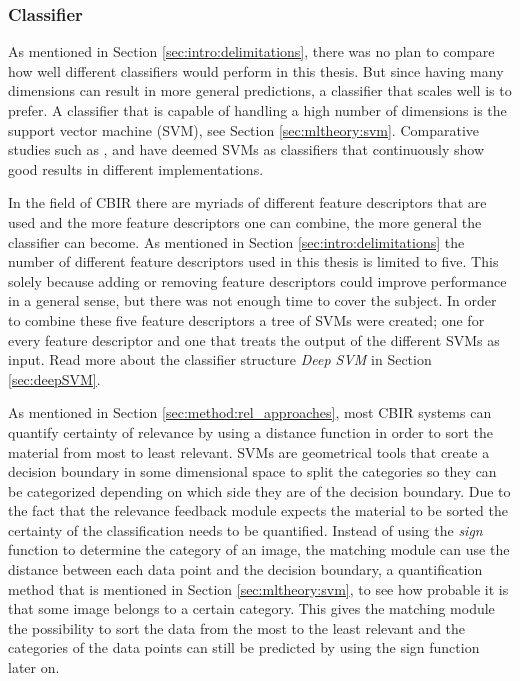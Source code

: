 \subsubsection{Classifier}
\label{sec:method:proposed:matching:classifier}
As mentioned in Section \ref{sec:intro:delimitations}, there was no plan to compare how well different classifiers would perform in this thesis. 
But since having many dimensions can result in more general predictions, a classifier that scales well is to prefer. A classifier that is capable of handling a high number of dimensions is the support vector machine (SVM), see Section \ref{sec:mltheory:svm}. 
Comparative studies such as \cite{IRJET2017classificationMethods}, \cite{SMMR2016comparisionClassificationMethods} and \cite{Informatica2007revClassification} have deemed SVMs as classifiers that continuously show good results in different implementations. 

In the field of CBIR there are myriads of different feature descriptors that are used and the more feature descriptors one can combine, the more general the classifier can become. As mentioned in Section \ref{sec:intro:delimitations} the number of different feature descriptors used in this thesis is limited to five. This solely because adding or removing feature descriptors could improve performance in a general sense, but there was not enough time to cover the subject. In order to combine these five feature descriptors a tree of SVMs were created; one for every feature descriptor and one that treats the output of the different SVMs as input. Read more about the classifier structure \emph{Deep SVM} in Section \ref{sec:deepSVM}. 

As mentioned in Section \ref{sec:method:rel_approaches}, most CBIR systems can quantify certainty of relevance by using a distance function in order to sort the material from most to least relevant. SVMs are geometrical tools that create a decision boundary in some dimensional space to split the categories so they can be categorized depending on which side they are of the decision boundary. Due to the fact that the relevance feedback module expects the material to be sorted the certainty of the classification needs to be quantified. Instead of using the \emph{sign} function to determine the category of an image, the matching module can use the distance between each data point and the decision boundary, a quantification method that is mentioned in Section \ref{sec:mltheory:svm}, to see how probable it is that some image belongs to a certain category. This gives the matching module the possibility to sort the data from the most to the least relevant and the categories of the data points can still be predicted by using the sign function later on.


